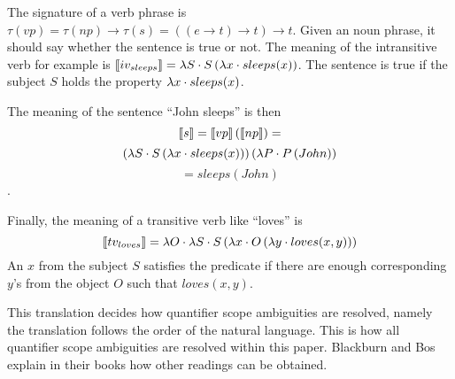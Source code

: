 The signature of a verb phrase is $\tau(vp) = \tau(np) \rightarrow \tau(s) = ((e \rightarrow t) \rightarrow t) \rightarrow t$. Given an noun phrase, it should say whether the sentence is true or not. The meaning of the intransitive verb for example is $\llbracket iv_{sleeps} \rrbracket = \lambda S \cdot S \left( \lambda x \cdot sleeps(x) \right)$. The sentence is true if the subject $S$ holds the property $\lambda x \cdot sleeps(x)$.

The meaning of the sentence ``John sleeps'' is then $$\llbracket s \rrbracket = \llbracket vp \rrbracket \left( \llbracket np \rrbracket \right) =$$ $$ \left( \lambda S \cdot S \left( \lambda x \cdot sleeps(x) \right) \right) \left( \lambda P \cdot P \left( John \right) \right)$$ $$= sleeps(John)$$.

Finally, the meaning of a transitive verb like ``loves'' is $$\llbracket tv_{loves} \rrbracket = \lambda O \cdot \lambda S \cdot S \left( \lambda x \cdot O \left( \lambda y \cdot loves(x, y) \right) \right)$$ An $x$ from the subject $S$ satisfies the predicate if there are enough corresponding $y$'s from the object $O$ such that $loves(x, y)$.

This translation decides how quantifier scope ambiguities are resolved, namely the translation follows the order of the natural language. This is how all quantifier scope ambiguities are resolved within this paper. Blackburn and Bos explain in their books how other readings can be obtained.




